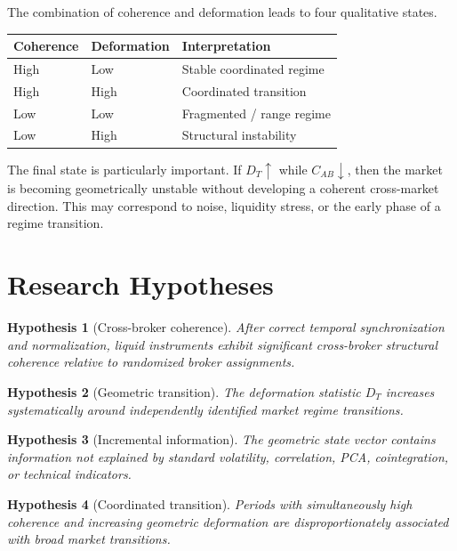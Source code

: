 \documentclass[11pt,a4paper]{article}
\numberwithin{equation}{section}
\newtheorem{hypothesis}{Hypothesis}
\begin{document}
The combination of coherence and deformation leads to four
qualitative states.

\begin{center}
\begin{tabular}{lll}
\toprule
Coherence & Deformation & Interpretation\\
\midrule
High & Low & Stable coordinated regime\\
High & High & Coordinated transition\\
Low & Low & Fragmented / range regime\\
Low & High & Structural instability\\
\bottomrule
\end{tabular}
\end{center}

The final state is particularly important. If $D_T\uparrow$ while
$C_{AB}\downarrow$, then the market is becoming geometrically
unstable without developing a coherent cross-market direction. This
may correspond to noise, liquidity stress, or the early phase of a
regime transition.

\section{Research Hypotheses}

\begin{hypothesis}[Cross-broker coherence]
After correct temporal synchronization and normalization, liquid
instruments exhibit significant cross-broker structural coherence
relative to randomized broker assignments.
\end{hypothesis}

\begin{hypothesis}[Geometric transition]
The deformation statistic $D_T$ increases systematically around
independently identified market regime transitions.
\end{hypothesis}

\begin{hypothesis}[Incremental information]
The geometric state vector contains information not explained by
standard volatility, correlation, PCA, cointegration, or technical
indicators.
\end{hypothesis}

\begin{hypothesis}[Coordinated transition]
Periods with simultaneously high coherence and increasing geometric
deformation are disproportionately associated with broad market
transitions.
\end{hypothesis}
\end{document}
